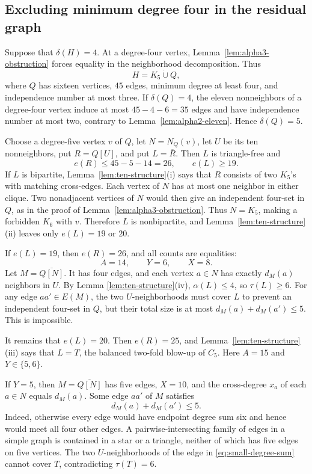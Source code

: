 \documentclass[11pt,reqno,a4paper]{amsart}
\theoremstyle{definition}
\theoremstyle{remark}
\newcommand{\comp}[1]{\overline{#1}}
\begin{document}
\subsection*{Excluding minimum degree four in the residual graph}

Suppose that $\delta(H)=4$.  At a degree-four vertex,
Lemma~\ref{lem:alpha3-obstruction} forces equality in the neighborhood
decomposition.  Thus
\[
  H=K_5\mathbin{\dot\cup}Q,
\]
where $Q$ has sixteen vertices, $45$ edges, minimum degree at least four,
and independence number at most three.  If $\delta(Q)=4$, the eleven
nonneighbors of a degree-four vertex induce at most $45-4-6=35$ edges and
have independence number at most two, contrary to
Lemma~\ref{lem:alpha2-eleven}.  Hence $\delta(Q)=5$.

Choose a degree-five vertex $v$ of $Q$, let $N=N_Q(v)$, let $U$ be its ten
nonneighbors, put $R=Q[U]$, and put $L=\comp R$.  Then $L$ is triangle-free
and
\begin{equation}\label{eq:Q-ten}
  e(R)\leq45-5-14=26,
  \qquad e(L)\geq19.
\end{equation}
If $L$ is bipartite, Lemma~\ref{lem:ten-structure}(i) says that $R$ consists
of two $K_5$'s with matching cross-edges.  Each vertex of $N$ has at most
one neighbor in either clique.  Two nonadjacent vertices of $N$ would then
give an independent four-set in $Q$, as in the proof of
Lemma~\ref{lem:alpha3-obstruction}.  Thus $N=K_5$, making a forbidden
$K_6$ with $v$.  Therefore $L$ is nonbipartite, and
Lemma~\ref{lem:ten-structure}(ii) leaves only $e(L)=19$ or $20$.

If $e(L)=19$, then $e(R)=26$, and all counts are equalities:
\[
  A=14,\qquad Y=6,\qquad X=8.
\]
Let $M=\comp{Q[N]}$.  It has four edges, and each vertex $a\in N$ has
exactly $d_M(a)$ neighbors in $U$.  By Lemma
\ref{lem:ten-structure}(iv), $\alpha(L)\leq4$, so $\tau(L)\geq6$.  For any
edge $aa'\in E(M)$, the two $U$-neighborhoods must cover $L$ to prevent an
independent four-set in $Q$, but their total size is at most
$d_M(a)+d_M(a')\leq5$.  This is impossible.

It remains that $e(L)=20$.  Then $e(R)=25$, and
Lemma~\ref{lem:ten-structure}(iii) says that $L=T$, the balanced two-fold
blow-up of $C_5$.  Here $A=15$ and $Y\in\{5,6\}$.

If $Y=5$, then $M=\comp{Q[N]}$ has five edges, $X=10$, and the cross-degree
$x_a$ of each $a\in N$ equals $d_M(a)$.  Some edge $aa'$ of $M$ satisfies
\begin{equation}\label{eq:small-degree-sum}
  d_M(a)+d_M(a')\leq5.
\end{equation}
Indeed, otherwise every edge would have endpoint degree sum six and hence
would meet all four other edges.  A pairwise-intersecting family of edges in
a simple graph is contained in a star or a triangle, neither of which has
five edges on five vertices.  The two $U$-neighborhoods of the edge in
\eqref{eq:small-degree-sum} cannot cover $T$, contradicting
$\tau(T)=6$.
\end{document}
